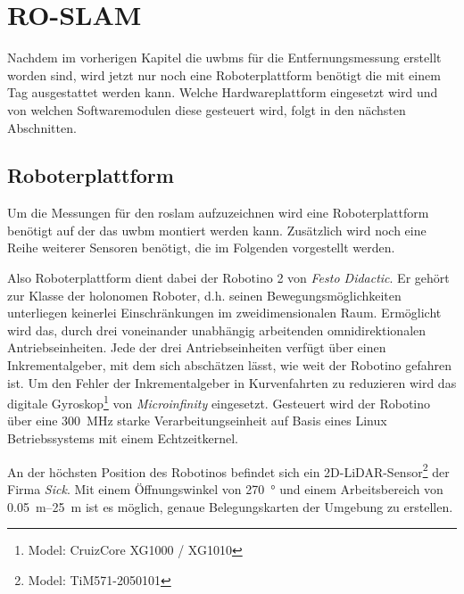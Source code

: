 \begin{comment}
------------------------------------------------------------------------------------------
\end{comment}
\chapter{RO-SLAM}\label{ch:ro_slam}

Nachdem im vorherigen Kapitel die \Glspl{uwbm} für die Entfernungsmessung erstellt worden sind, wird jetzt nur noch eine Roboterplattform benötigt die mit einem Tag ausgestattet werden kann. Welche Hardwareplattform eingesetzt wird und von welchen Softwaremodulen diese gesteuert wird, folgt in den nächsten Abschnitten.

\begin{comment}
--------------------------------------------------------------------------------
- Einsatz mobiler Roboter in der Logistik am Beispiel des Robotino
	- http://www.r-moehrle.de/wissenschaftlicheArbeiten/robotino1.pdf
\end{comment}
\section{Roboterplattform}

Um die Messungen für den \Gls{roslam} aufzuzeichnen wird eine Roboterplattform benötigt auf der das \Gls{uwbm} montiert werden kann. Zusätzlich wird noch eine Reihe weiterer Sensoren benötigt, die im Folgenden vorgestellt werden.

Also Roboterplattform dient dabei der Robotino 2 von \textit{Festo Didactic}. Er gehört zur Klasse der holonomen Roboter, d.h. seinen Bewegungsmöglichkeiten unterliegen keinerlei Einschränkungen im zweidimensionalen Raum. Ermöglicht wird das, durch drei voneinander unabhängig arbeitenden omnidirektionalen Antriebseinheiten. Jede der drei Antriebseinheiten verfügt über einen Inkrementalgeber, mit dem sich abschätzen lässt, wie weit der Robotino gefahren ist. Um den Fehler der Inkrementalgeber in Kurvenfahrten zu reduzieren wird das digitale Gyroskop\footnote{Model: CruizCore XG1000 / XG1010} von \textit{Microinfinity} eingesetzt. Gesteuert wird der Robotino über eine \SI{300}{\MHz} starke Verarbeitungseinheit auf Basis eines Linux Betriebssystems mit einem Echtzeitkernel. \cite{festo2007robotinomanual}

An der höchsten Position des Robotinos befindet sich ein 2D-LiDAR-Sensor\footnote{Model: TiM571-2050101} der Firma \textit{Sick}. Mit einem Öffnungswinkel von \SI{270}{\degree} und einem Arbeitsbereich von \SIrange{0.05}{25}{\meter} ist es möglich, genaue Belegungskarten der Umgebung zu erstellen. \cite{sick2016operatingmanual}

